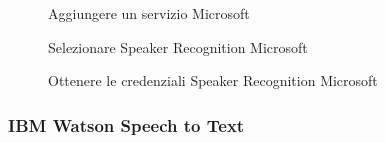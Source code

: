 \begin{figure}[h]
	\caption{Aggiungere un servizio Microsoft}\label{fig:addMicrosoft}
\end{figure}
\begin{figure}[h]
	\caption{Selezionare Speaker Recognition Microsoft}\label{fig:speakerRec}
\end{figure}
\begin{figure}[h]
	\caption{Ottenere le credenziali Speaker Recognition Microsoft}\label{fig:credMicrosoft}
\end{figure}
\newpage
\subsubsection{IBM Watson Speech to Text}\label{watson-key}
